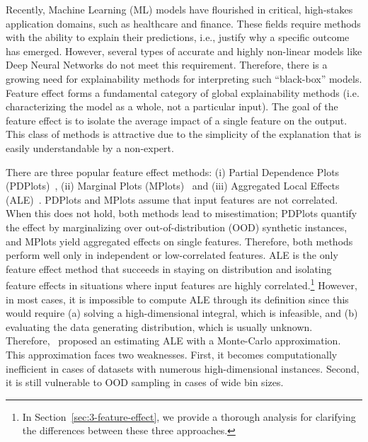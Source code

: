 Recently, Machine Learning (ML) models have flourished in critical, high-stakes application domains, such as healthcare and finance. These fields require methods with the ability to explain their predictions, i.e., justify why a specific outcome has emerged. However, several types of accurate and highly non-linear models like Deep Neural Networks do not meet this requirement. Therefore, there is a growing need for explainability methods for interpreting such ``black-box'' models. Feature effect forms a fundamental category of global explainability methods (i.e. characterizing the model as a whole, not a particular input). The goal of the feature effect is to isolate the average impact of a single feature on the output. This class of methods is attractive due to the simplicity of the explanation that is easily understandable by a non-expert.

There are three popular feature effect methods: (i) Partial Dependence Plots (PDPlots)~\citep{Friedman2001}, (ii) Marginal Plots (MPlots)~\citep{Apley2020} and (iii) Aggregated Local Effects (ALE)~\citep{Apley2020}. PDPlots and MPlots assume that input features are not correlated. When this does not hold, both methods lead to misestimation; PDPlots quantify the effect by marginalizing over out-of-distribution (OOD) synthetic instances, and MPlots yield aggregated effects on single features. Therefore, both methods perform well only in independent or low-correlated features. ALE is the only feature effect method that succeeds in staying on distribution and isolating feature effects in situations where input features are highly correlated.\footnote{In Section~\ref{sec:3-feature-effect}, we provide a thorough analysis for clarifying the differences between these three approaches.} However, in most cases, it is impossible to compute ALE through its definition since this would require (a) solving a high-dimensional integral, which is infeasible, and (b) evaluating the data generating distribution, which is usually unknown. Therefore,~\cite{Apley2020} proposed an estimating ALE with a Monte-Carlo approximation. This approximation faces two weaknesses. First, it becomes computationally inefficient in cases of datasets with numerous high-dimensional instances. Second, it is still vulnerable to OOD sampling in cases of wide bin sizes.

